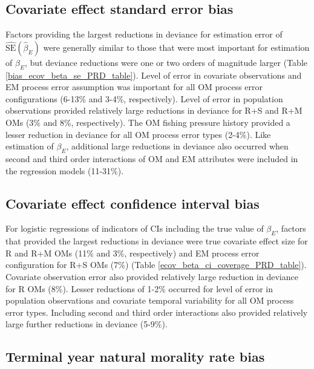 \documentclass[
  12pt,
]{article}
\begin{document}
\subsection*{Covariate effect standard error
bias}\label{covariate-effect-standard-error-bias}

Factors providing the largest reductions in deviance for estimation
error of \(\widehat {\text{SE}}\left(\widehat\beta_E\right)\) were
generally similar to those that were most important for estimation of
\(\beta_E\), but deviance reductions were one or two orders of magnitude
larger (Table \ref{bias_ecov_beta_se_PRD_table}). Level of error in
covariate observations and EM process error assumption was important for
all OM process error configurations (6-13\% and 3-4\%, respectively).
Level of error in population observations provided relatively large
reductions in deviance for R+S and R+M OMs (3\% and 8\%, respectively).
The OM fishing pressure history provided a lesser reduction in deviance
for all OM process error types (2-4\%). Like estimation of \(\beta_E\),
additional large reductions in deviance also occurred when second and
third order interactions of OM and EM attributes were included in the
regression models (11-31\%).

\subsection*{Covariate effect confidence interval
bias}\label{covariate-effect-confidence-interval-bias}

For logistic regressions of indicators of CIs including the true value
of \(\beta_E\), factors that provided the largest reductions in deviance
were true covariate effect size for R and R+M OMs (11\% and 3\%,
respectively) and EM process error configuration for R+S OMs (7\%)
(Table \ref{ecov_beta_ci_coverage_PRD_table}). Covariate observation
error also provided relatively large reduction in deviance for R OMs
(8\%). Lesser reductions of 1-2\% occurred for level of error in
population observations and covariate temporal variability for all OM
process error types. Including second and third order interactions also
provided relatively large further reductions in deviance (5-9\%).

\subsection*{Terminal year natural morality rate
bias}\label{terminal-year-natural-morality-rate-bias}
\end{document}
